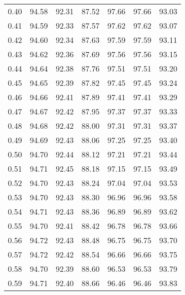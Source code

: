 \begin{tabular}{|c|c|c|c|c|c|c|}
      0.40 &     94.58 &     92.31 &      87.52 &   97.66 &      97.66 &         93.03 \\
      0.41 &     94.59 &     92.33 &      87.57 &   97.62 &      97.62 &         93.07 \\
      0.42 &     94.60 &     92.34 &      87.63 &   97.59 &      97.59 &         93.11 \\
      0.43 &     94.62 &     92.36 &      87.69 &   97.56 &      97.56 &         93.15 \\
      0.44 &     94.64 &     92.38 &      87.76 &   97.51 &      97.51 &         93.20 \\
      0.45 &     94.65 &     92.39 &      87.82 &   97.45 &      97.45 &         93.24 \\
      0.46 &     94.66 &     92.41 &      87.89 &   97.41 &      97.41 &         93.29 \\
      0.47 &     94.67 &     92.42 &      87.95 &   97.37 &      97.37 &         93.33 \\
      0.48 &     94.68 &     92.42 &      88.00 &   97.31 &      97.31 &         93.37 \\
      0.49 &     94.69 &     92.43 &      88.06 &   97.25 &      97.25 &         93.40 \\
      0.50 &     94.70 &     92.44 &      88.12 &   97.21 &      97.21 &         93.44 \\
      0.51 &     94.71 &     92.45 &      88.18 &   97.15 &      97.15 &         93.49 \\
      0.52 &     94.70 &     92.43 &      88.24 &   97.04 &      97.04 &         93.53 \\
      0.53 &     94.70 &     92.43 &      88.30 &   96.96 &      96.96 &         93.58 \\
      0.54 &     94.71 &     92.43 &      88.36 &   96.89 &      96.89 &         93.62 \\
      0.55 &     94.70 &     92.41 &      88.42 &   96.78 &      96.78 &         93.66 \\
      0.56 &     94.72 &     92.43 &      88.48 &   96.75 &      96.75 &         93.70 \\
      0.57 &     94.72 &     92.42 &      88.54 &   96.66 &      96.66 &         93.75 \\
      0.58 &     94.70 &     92.39 &      88.60 &   96.53 &      96.53 &         93.79 \\
      0.59 &     94.71 &     92.40 &      88.66 &   96.46 &      96.46 &         93.83 \\

\end{tabular}
